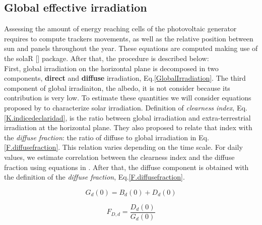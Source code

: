 \subsection{Global effective irradiation}

Assessing the amount of energy reaching cells of the photovoltaic generator requires to compute trackers movements, as well as the relative position between sun and panels throughout the year. These equations are computed making use of the solaR [] package. After that, the procedure is described below:\\

First, global irradiation on the horizontal plane is decomposed in two components, \textbf{direct} and \textbf{diffuse} irradiation, Eq.\ref{GlobalIrradiation}. The third component of global irradiaiton, the albedo, it is  not consider because its contribution is very low. To estimate these quantities we will consider equations proposed by \cite{Liu1960} to characterize solar irradiation. Definition of \textit{clearness index}, Eq.\ref{K.indicedeclaridad}, is the ratio between global irradiation and extra-terrestrial irradiation at the horizontal plane. They also proposed to relate that index with the \textit{diffuse fraction}: the ratio of diffuse to global irradiation in Eq.\ref{F.diffusefraction}. This relation varies depending on the time scale. For daily values, we estimate correlation between the clearness index and the diffuse fraction using equations in \cite{Aguiar1992}. After that, the diffuse component is obtained with the definition of the \textit{diffuse fraction}, Eq.\ref{F.diffusefraction}.

\begin{equation}\label{GlobalIrradiation}
G_{d}(0) = B_{d}(0) + D_{d}(0)
\end{equation}



\begin{equation}\label{F.diffusefraction}
F_{D,d}=\frac{D_{d}(0)}{G_{d}(0)}
\end{equation}

